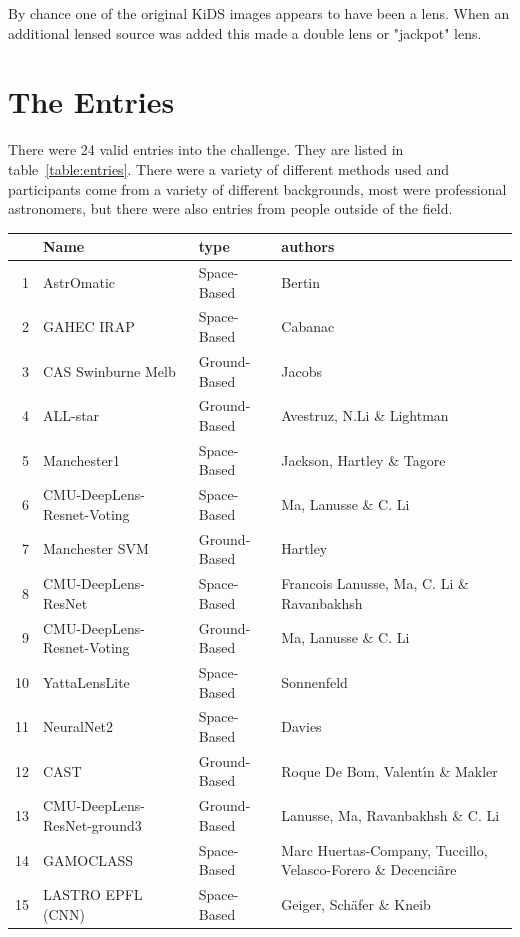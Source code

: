 \documentclass[useAMS,usenatbib]{mnras}
\begin{document}
By chance one of the original KiDS images appears to have been a lens.  When an additional lensed source was added this made a double lens or "jackpot" lens.

\section{The Entries}
\label{sec:entries}

There were 24 valid entries into the challenge.  They are listed in table~\ref{table:entries}.  There were a variety of different methods used and participants come from a variety of different backgrounds, most were professional astronomers, but there were also entries from people outside of the field.  

\begin{table}
\centering
\begin{tabular}{rlll}
  \hline
 & Name & type & authors \\ 
  \hline
  1 & AstrOmatic & Space-Based & Bertin   \\ 
  2 & GAHEC IRAP & Space-Based & Cabanac  \\ 
  3 & CAS Swinburne Melb & Ground-Based & Jacobs   \\ 
  4 & ALL-star & Ground-Based & Avestruz, N.Li \& Lightman  \\ 
  5 & Manchester1 & Space-Based & Jackson, Hartley \& Tagore  \\ 
  6 & CMU-DeepLens-Resnet-Voting & Space-Based & Ma, Lanusse \& C. Li  \\ 
  7 & Manchester SVM & Ground-Based & Hartley   \\ 
  8 & CMU-DeepLens-ResNet & Space-Based & Francois Lanusse, Ma, C. Li \& Ravanbakhsh \\ 
  9 & CMU-DeepLens-Resnet-Voting & Ground-Based & Ma, Lanusse \& C. Li   \\ 
  10 & YattaLensLite & Space-Based &  Sonnenfeld  \\ 
  11 & NeuralNet2 & Space-Based &  Davies  \\ 
  12 & CAST & Ground-Based &  Roque De Bom, Valent\'{\i}n \&  Makler  \\ 
  13 & CMU-DeepLens-ResNet-ground3 & Ground-Based &  Lanusse, Ma, Ravanbakhsh \& C. Li \\ 
  14 & GAMOCLASS & Space-Based & Marc Huertas-Company, Tuccillo, Velasco-Forero \& Decenci\~{a}re \\ 
  15 & LASTRO EPFL (CNN) & Space-Based & Geiger, Sch\"{a}fer \& Kneib \\ 

\end{tabular}
\end{table}
\end{document}
